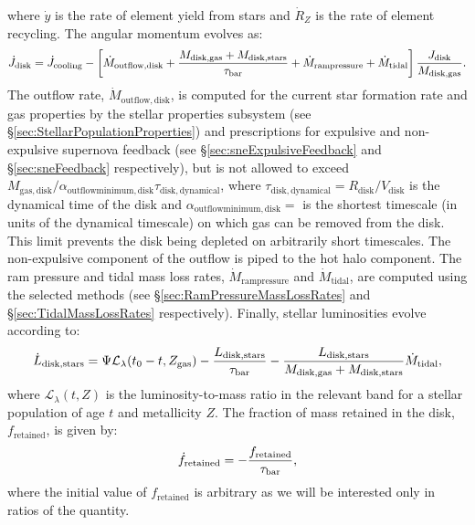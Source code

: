 where $\dot{y}$ is the rate of element yield from stars and $\dot{R}_Z$ is the rate of element recycling. The angular momentum evolves as:
\begin{equation}
 \dot{J}_\mathrm{disk} = \dot{J}_\mathrm{cooling} - \left[ \dot{M}_\mathrm{outflow, disk} + {M_\mathrm{disk, gas}  + M_\mathrm{disk, stars} \over \tau_\mathrm{bar}} + \dot{M}_\mathrm{ram pressure} + \dot{M}_\mathrm{tidal}\right] {J_\mathrm{disk} \over M_\mathrm{disk, gas}}.
\end{equation}
The outflow rate, $\dot{M}_\mathrm{outflow, disk}$, is computed for the current star formation rate and gas properties by the stellar properties subsystem (see \S\ref{sec:StellarPopulationProperties}) and prescriptions for expulsive and non-expulsive supernova feedback (see \S\ref{sec:sneExpulsiveFeedback} and \S\ref{sec:sneFeedback} respectively), but is not allowed to exceed $M_\mathrm{gas, disk}/ \alpha_\mathrm{outflow minimum, disk} \tau_\mathrm{disk, dynamical}$, where $\tau_\mathrm{disk, dynamical}=R_\mathrm{disk}/V_\mathrm{disk}$ is the dynamical time of the disk and $\alpha_\mathrm{outflow minimum, disk}=${\normalfont \ttfamily [diskOutflowTimescaleMinimum]} is the shortest timescale (in units of the dynamical timescale) on which gas can be removed from the disk. This limit prevents the disk being depleted on arbitrarily short timescales. The non-expulsive \gls{component} of the outflow is piped to the hot halo component.  The ram pressure and tidal mass loss rates, $\dot{M}_\mathrm{ram pressure}$ and $\dot{M}_\mathrm{tidal}$, are computed using the selected methods (see \S\ref{sec:RamPressureMassLossRates} and \S\ref{sec:TidalMassLossRates} respectively).
Finally, stellar luminosities evolve according to:
\begin{equation}
\dot{L}_\mathrm{disk, stars} = \Psi \mathcal{L}_\lambda(t_0-t,Z_\mathrm{gas})  - {L_\mathrm{disk, stars} \over \tau_\mathrm{bar}} - {L_\mathrm{disk, stars} \over M_\mathrm{disk, gas} + M_\mathrm{disk, stars}} \dot{M}_\mathrm{tidal},
\end{equation}
where $\mathcal{L}_\lambda(t,Z)$ is the luminosity-to-mass ratio in the relevant band for a stellar population of age $t$ and metallicity $Z$. The fraction of mass retained in the disk, $f_\mathrm{retained}$, is given by:
\begin{equation}
  \dot{f}_\mathrm{retained} = - {f_\mathrm{retained} \over \tau_\mathrm{bar}},
\end{equation}
where the initial value of $f_\mathrm{retained}$ is arbitrary as we will be interested only in ratios of the quantity.

